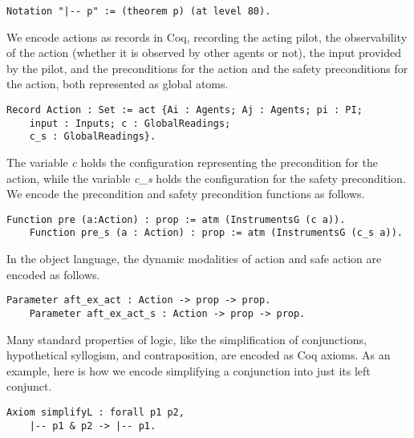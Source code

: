 \begin{tcolorbox}	\begin{lstlisting}[language=Coq]
	Notation "|-- p" := (theorem p) (at level 80).
	\end{lstlisting}
\end{tcolorbox}
We encode actions as records in Coq, recording the acting pilot, the observability of the action (whether it is observed by other agents or not), the input provided by the pilot, and the preconditions for the action and the safety preconditions for the action, both represented as global atoms.
\begin{tcolorbox}
	\begin{lstlisting}[language=Coq]
	Record Action : Set := act {Ai : Agents; Aj : Agents; pi : PI; 
	input : Inputs; c : GlobalReadings; 
	c_s : GlobalReadings}.
	\end{lstlisting}
\end{tcolorbox}
The variable \emph{c} holds the configuration representing the precondition for the action, while the variable \emph{c\_s} holds the configuration for the safety precondition.
We encode the precondition and safety precondition functions as follows.
\begin{tcolorbox}
	\begin{lstlisting}[language=Coq]
	Function pre (a:Action) : prop := atm (InstrumentsG (c a)).
	Function pre_s (a : Action) : prop := atm (InstrumentsG (c_s a)).
	\end{lstlisting}
\end{tcolorbox}
In the object language, the dynamic modalities of action and safe action are encoded as follows.
\begin{tcolorbox}\begin{lstlisting}[language=Coq]
	Parameter aft_ex_act : Action -> prop -> prop.
	Parameter aft_ex_act_s : Action -> prop -> prop.
	\end{lstlisting}
\end{tcolorbox}
Many standard properties of logic, like the simplification of conjunctions, hypothetical syllogism, and contraposition, are encoded as Coq axioms. As an example, here is how we encode simplifying a conjunction into just its left conjunct.
\begin{tcolorbox}
	\begin{lstlisting}[language=Coq]
	Axiom simplifyL : forall p1 p2,
	|-- p1 & p2 -> |-- p1.
	\end{lstlisting}
\end{tcolorbox}
